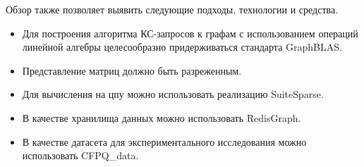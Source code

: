 Обзор также позволяет выявить следующие подходы, технологии и средства.
\begin{itemize}
	\item Для построения алгоритма КС-запросов к графам с использованием операций линейной алгебры целесообразно придерживаться стандарта GraphBLAS.
	\item Представление матриц должно быть разреженным.
	\item Для вычисления на цпу можно использовать реализацию SuiteSparse.
	\item В качестве хранилища данных можно использовать RedisGraph.
	\item В качестве датасета для экспериментального исследования можно использовать CFPQ\_data.
\end{itemize}


\FloatBarrier

